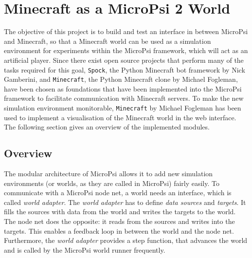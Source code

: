 \chapter{Minecraft as a MicroPsi 2 World}
\label{chap:4}
The objective of this project is to build and test an interface in between MicroPsi and Minecraft, so that a Minecraft world can be used as a simulation environment for experiments within the MicroPsi framework, which will act as an artificial player. Since there exist open source projects that perform many of the tasks required for this goal, \texttt{Spock}, the Python Minecraft bot framework by Nick Gamberini, and \texttt{Minecraft}, the Python Minecraft clone by Michael Fogleman, have been chosen as foundations that have been implemented into the MicroPsi framework to facilitate communication with Minecraft servers. To make the new simulation environment monitorable, \texttt{Minecraft} by Michael Fogleman has been used to implement a visualisation of the Minecraft world in the web interface. The following section gives an overview of the implemented modules.

\section{Overview}



The modular architecture of MicroPsi allows it to add new simulation environments (or worlds, as they are called in MicroPsi) fairly easily. To communicate with a MicroPsi node net, a world needs an interface, which is called \emph{world adapter}. The \emph{world adapter} has to define \emph{data sources} and \emph{targets}. It fills the sources with data from the world and writes the targets to the world. The node net does the opposite: it reads from the sources and writes into the targets. This enables a feedback loop in between the world and the node net. Furthermore, the \emph{world adapter} provides a step function, that advances the world and is called by the MicroPsi world runner frequently.

